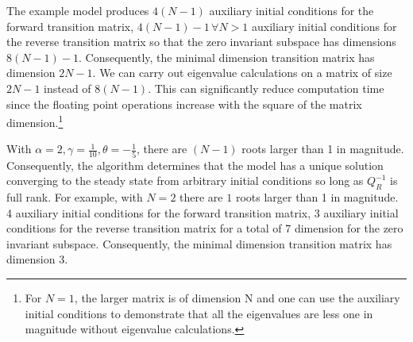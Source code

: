 The example model 
produces $4(N-1)$  auxiliary initial conditions for the forward transition matrix, $4(N-1)-1\,\forall N>1$ auxiliary initial conditions for the reverse
transition matrix so that the zero invariant subspace has 
dimensions $8(N-1)-1$. Consequently, the minimal dimension
transition matrix has dimension $2N-1$.  We can carry out
eigenvalue calculations on a matrix of size $2N-1$ instead of $8(N-1)$. This can
significantly reduce computation time since
the floating point operations increase with the square of the matrix 
dimension.\footnote{For $N=1$, the larger matrix is  of dimension N and one can use the
auxiliary initial conditions to
demonstrate that all the eigenvalues are less one in magnitude without 
eigenvalue calculations.}


With $\alpha=2,\gamma={\frac{1}{10}},\theta=-{\frac{1}{5}}$,
 there are 
  $(N-1)$ roots larger than 1 in magnitude. 
Consequently, the algorithm determines
that the model has a unique solution converging to the steady state from arbitrary initial conditions so long as $Q_R^{-1}$ is full rank.
For example, with $N=2$
 there are 
  $1$ roots larger than 1 in magnitude. 
4 auxiliary initial conditions for the forward transition matrix, 3 auxiliary initial conditions for the reverse
transition matrix for a total of 7 dimension for the zero invariant subspace. Consequently, the minimal dimension
transition matrix has dimension $3$.  
